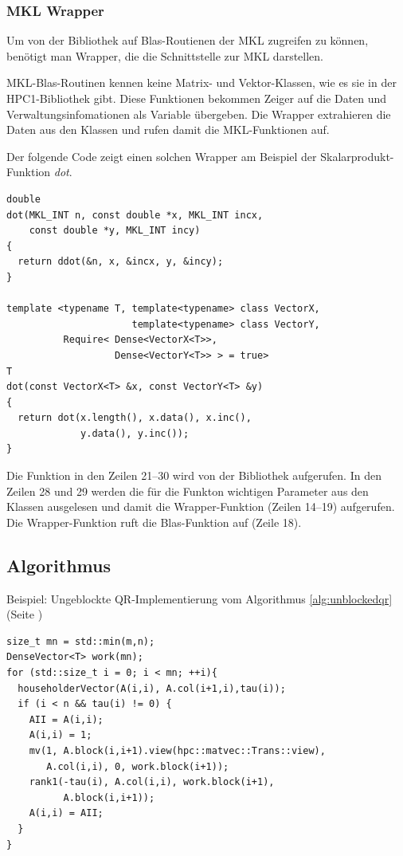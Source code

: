 \subsubsection{MKL Wrapper}
Um von der Bibliothek auf Blas-Routienen der MKL zugreifen zu können, benötigt man Wrapper, die die Schnittstelle zur MKL darstellen.

MKL-Blas-Routinen kennen keine Matrix- und Vektor-Klassen, wie es sie in der HPC1-Bibliothek gibt. Diese Funktionen bekommen Zeiger auf die Daten und Verwaltungsinfomationen als Variable übergeben.
Die Wrapper extrahieren die Daten aus den Klassen und rufen damit die MKL-Funktionen auf.

Der folgende Code zeigt einen solchen Wrapper am Beispiel der Skalarprodukt-Funktion \textit{dot}.
\lstset{numbers=left,firstnumber=14}
\begin{lstlisting}
double
dot(MKL_INT n, const double *x, MKL_INT incx,
    const double *y, MKL_INT incy)
{
  return ddot(&n, x, &incx, y, &incy);
}

template <typename T, template<typename> class VectorX,
                      template<typename> class VectorY,
          Require< Dense<VectorX<T>>,
                   Dense<VectorY<T>> > = true>
T
dot(const VectorX<T> &x, const VectorY<T> &y)
{
  return dot(x.length(), x.data(), x.inc(), 
             y.data(), y.inc());
}
\end{lstlisting}
Die Funktion in den Zeilen 21--30 wird von der Bibliothek aufgerufen.
In den Zeilen 28 und 29 werden die für die Funkton wichtigen Parameter aus den Klassen ausgelesen und damit die Wrapper-Funktion (Zeilen 14--19) aufgerufen. Die Wrapper-Funktion ruft die Blas-Funktion auf (Zeile 18).


\subsection{Algorithmus}

Beispiel: Ungeblockte QR-Implementierung vom Algorithmus \ref{alg:unblockedqr} (Seite \pageref{alg:unblockedqr})
\lstset{numbers=left,firstnumber=1}
\begin{lstlisting}
size_t mn = std::min(m,n);
DenseVector<T> work(mn);
for (std::size_t i = 0; i < mn; ++i){
  householderVector(A(i,i), A.col(i+1,i),tau(i));
  if (i < n && tau(i) != 0) {
    AII = A(i,i);
    A(i,i) = 1;
    mv(1, A.block(i,i+1).view(hpc::matvec::Trans::view),
       A.col(i,i), 0, work.block(i+1));
    rank1(-tau(i), A.col(i,i), work.block(i+1), 
          A.block(i,i+1));
    A(i,i) = AII;
  }
}
\end{lstlisting}

